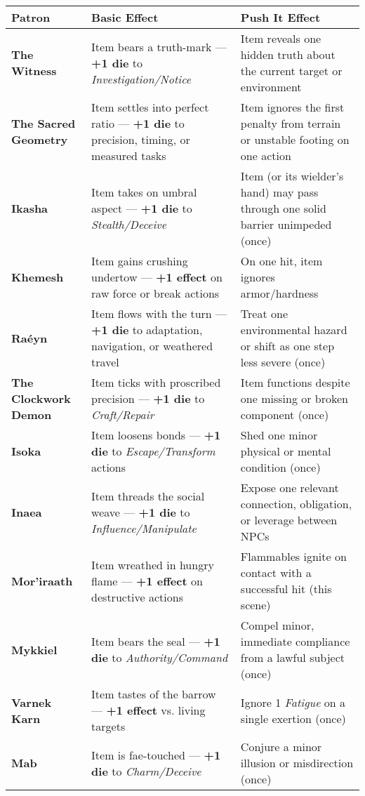 \documentclass[12pt,twoside]{book}
\begin{document}
\begin{table}[htbp]
\centering
\small
\renewcommand{\arraystretch}{1.1}
\begin{tabular}{>{\bfseries}p{3.2cm} >{\raggedright\arraybackslash}p{6.1cm} >{\raggedright\arraybackslash}p{6.1cm}}
\toprule
\textbf{Patron} & \textbf{Basic Effect} & \textbf{Push It Effect} \\
\midrule
The Witness & Item bears a truth-mark — \textbf{+1 die} to \emph{Investigation/Notice} & Item reveals one hidden truth about the current target or environment \\
The Sacred Geometry & Item settles into perfect ratio — \textbf{+1 die} to precision, timing, or measured tasks & Item ignores the first penalty from terrain or unstable footing on one action \\
Ikasha & Item takes on umbral aspect — \textbf{+1 die} to \emph{Stealth/Deceive} & Item (or its wielder's hand) may pass through one solid barrier unimpeded (once) \\
Khemesh & Item gains crushing undertow — \textbf{+1 effect} on raw force or break actions & On one hit, item ignores armor/hardness \\
Raéyn & Item flows with the turn — \textbf{+1 die} to adaptation, navigation, or weathered travel & Treat one environmental hazard or shift as one step less severe (once) \\
The Clockwork Demon & Item ticks with proscribed precision — \textbf{+1 die} to \emph{Craft/Repair} & Item functions despite one missing or broken component (once) \\
Isoka & Item loosens bonds — \textbf{+1 die} to \emph{Escape/Transform} actions & Shed one minor physical or mental condition (once) \\
Inaea & Item threads the social weave — \textbf{+1 die} to \emph{Influence/Manipulate} & Expose one relevant connection, obligation, or leverage between NPCs \\
Mor'iraath & Item wreathed in hungry flame — \textbf{+1 effect} on destructive actions & Flammables ignite on contact with a successful hit (this scene) \\
Mykkiel & Item bears the seal — \textbf{+1 die} to \emph{Authority/Command} & Compel minor, immediate compliance from a lawful subject (once) \\
Varnek Karn & Item tastes of the barrow — \textbf{+1 effect} vs. living targets & Ignore 1 \emph{Fatigue} on a single exertion (once) \\
Mab & Item is fae-touched — \textbf{+1 die} to \emph{Charm/Deceive} & Conjure a minor illusion or misdirection (once) \\

\end{tabular}
\end{table}
\end{document}
